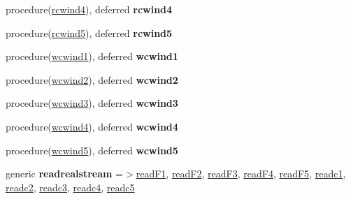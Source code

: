 \begin{DoxyCompactItemize}
procedure(\hyperlink{interfacegeneric__file__mod_1_1rcwind4}{rcwind4}), deferred {\bfseries rcwind4}
\item 
\mbox{\label{structgeneric__file__mod_1_1genericregfile_a2af9866bc6d4a2ef43897e2071314a05}} 
procedure(\hyperlink{interfacegeneric__file__mod_1_1rcwind5}{rcwind5}), deferred {\bfseries rcwind5}
\item 
\mbox{\label{structgeneric__file__mod_1_1genericregfile_a1e9668494ce28a28674dd7739aaa2e5f}} 
procedure(\hyperlink{interfacegeneric__file__mod_1_1wcwind1}{wcwind1}), deferred {\bfseries wcwind1}
\item 
\mbox{\label{structgeneric__file__mod_1_1genericregfile_ac4430f639582d71f190bf6ece359aea1}} 
procedure(\hyperlink{interfacegeneric__file__mod_1_1wcwind2}{wcwind2}), deferred {\bfseries wcwind2}
\item 
\mbox{\label{structgeneric__file__mod_1_1genericregfile_a58b5ac7ea3adbff401fdee0c04ca4545}} 
procedure(\hyperlink{interfacegeneric__file__mod_1_1wcwind3}{wcwind3}), deferred {\bfseries wcwind3}
\item 
\mbox{\label{structgeneric__file__mod_1_1genericregfile_aa944032fc447c8374e86fff5beeb6e4d}} 
procedure(\hyperlink{interfacegeneric__file__mod_1_1wcwind4}{wcwind4}), deferred {\bfseries wcwind4}
\item 
\mbox{\label{structgeneric__file__mod_1_1genericregfile_a761c74b3033ccc588707e3c9d701fb1a}} 
procedure(\hyperlink{interfacegeneric__file__mod_1_1wcwind5}{wcwind5}), deferred {\bfseries wcwind5}
\item 
\mbox{\label{structgeneric__file__mod_1_1genericregfile_a5cc6217d1b028ba937af1be10454bfae}} 
generic {\bfseries readrealstream} =$>$\hyperlink{interfacegeneric__file__mod_1_1read_f1}{read\+F1}, \hyperlink{interfacegeneric__file__mod_1_1read_f2}{read\+F2}, \hyperlink{interfacegeneric__file__mod_1_1read_f3}{read\+F3}, \hyperlink{interfacegeneric__file__mod_1_1read_f4}{read\+F4}, \hyperlink{interfacegeneric__file__mod_1_1read_f5}{read\+F5}, \hyperlink{interfacegeneric__file__mod_1_1readc1}{readc1}, \hyperlink{interfacegeneric__file__mod_1_1readc2}{readc2}, \hyperlink{interfacegeneric__file__mod_1_1readc3}{readc3}, \hyperlink{interfacegeneric__file__mod_1_1readc4}{readc4}, \hyperlink{interfacegeneric__file__mod_1_1readc5}{readc5}

\end{DoxyCompactItemize}
